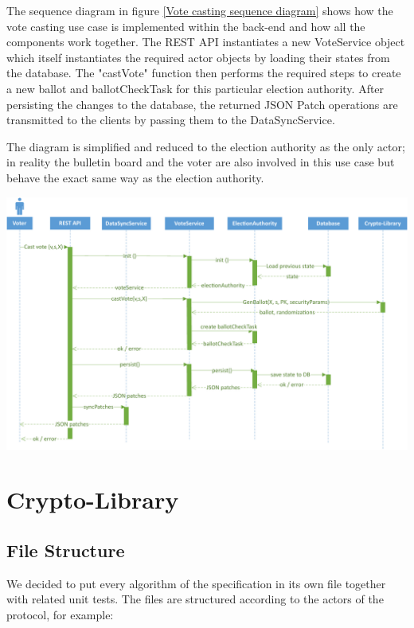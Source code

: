 The sequence diagram in figure \ref{Vote casting sequence diagram} shows how the vote casting use case is implemented within the back-end and how all the components work together. The REST API instantiates a new VoteService object which itself instantiates the required actor objects by loading their states from the database. The "{}castVote"{} function then performs the required steps to create a new ballot and ballotCheckTask for this particular election authority. After persisting the changes to the database, the returned JSON Patch operations are transmitted to the clients by passing them to the DataSyncService.

The diagram is simplified and reduced to the election authority as the only actor; in reality the bulletin board and the voter are also involved in this use case but behave the exact same way as the election authority.

\begin{center}
\includegraphics[scale=0.62]{assets/votecastingDiagram.pdf}
\label{Vote casting sequence diagram}%
\end{center}

\section{Crypto-Library}

\subsection{File Structure}
We decided to put every algorithm of the specification in its own file together with related unit tests. The files are structured according to the actors of the protocol, for example:


